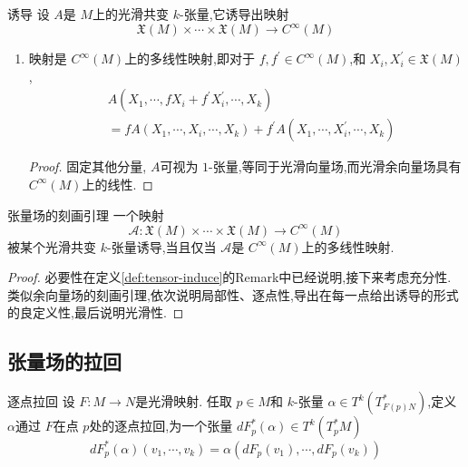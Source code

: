\documentclass[../../几何与拓扑.tex]{subfiles}
\begin{document}
\begin{definition}{诱导}\label{def:tensor-induce}
    设 $ A $是 $ M $上的光滑共变 $ k $-张量,它诱导出映射 $$
    \mathfrak{X}\left( M \right)\times \cdots \times  \mathfrak{X}\left( M \right)\to C^{\infty}\left( M \right)   
    $$
\end{definition}
\begin{remark}
    \begin{enumerate}
        \item 映射是 $ C^{\infty}\left( M \right)  $上的多线性映射,即对于 $ f,f^{\prime} \in C^{\infty}\left( M \right)  $,和 $ X_{i},X_{i}^{\prime} \in \mathfrak{X}\left( M \right)  $, $$
        \begin{aligned}
        & A\left( X_1,\cdots ,fX_{i}+ f^{\prime} X_{i}^{\prime} ,\cdots ,X_{k} \right)  \\ 
         & = fA\left( X_1,\cdots ,X_{i},\cdots ,X_{k} \right)+ f^{\prime} A\left( X_1,\cdots ,X_{i}^{\prime} ,\cdots ,X_{k} \right)  
        \end{aligned}
        $$
        \begin{proof}
            固定其他分量, $ A $可视为 $ 1 $-张量,等同于光滑向量场,而光滑余向量场具有 $ C^{\infty}\left( M \right)  $上的线性.   
        \end{proof}  
        
    \end{enumerate}
    
\end{remark}
\begin{lemma}{张量场的刻画引理}\label{tensor-char-lemma}
一个映射 $$
\mathscr{A}: \mathfrak{X}\left( M \right) \times \cdots \times \mathfrak{X}\left( M \right) \to C^{\infty}\left( M \right)  
$$被某个光滑共变 $ k $-张量诱导,当且仅当 $ \mathscr{A} $是 $ C^{\infty}\left( M \right)  $上的多线性映射.   
\end{lemma}
\begin{proof}
    必要性在定义\ref{def:tensor-induce}的Remark中已经说明,接下来考虑充分性.\\ 
    类似余向量场的刻画引理,依次说明局部性、逐点性,导出在每一点给出诱导的形式的良定义性,最后说明光滑性.
\end{proof}

\subsection{张量场的拉回}
\begin{definition}{逐点拉回}
    设 $ F:M\to N $是光滑映射. 任取 $ p \in M $和 $ k $-张量 $ \alpha \in T^{k}\left( T^{*}_{F\left( p \right)N } \right)  $,定义 $ \alpha $通过 $ F $在点 $ p $处的逐点拉回,为一个张量 $ d F_{p}^{*}\left( \alpha \right)\in T^{k}\left( T_{p}^{*}M \right)   $ $$
    dF_{p}^{*}\left( \alpha \right)\left( v_1,\cdots ,v_{k} \right) = \alpha\left( d F_{p } \left( v_1 \right),\cdots ,d F_{p}\left( v_{k} \right) \right)   
    $$       
\end{definition}  
\end{document}

